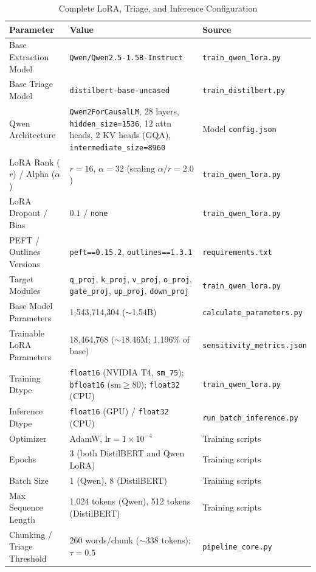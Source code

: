 \documentclass[11pt,a4paper]{article}
\begin{document}
\begin{table}[htbp]
\centering
\caption{Complete LoRA, Triage, and Inference Configuration}
\label{tab:lora_config}
\small
\begin{tabular}{@{}p{3.4cm} p{6.2cm} p{3.2cm}@{}}
\toprule
\textbf{Parameter} & \textbf{Value} & \textbf{Source} \\
\midrule
Base Extraction Model & \texttt{Qwen/Qwen2.5-1.5B-Instruct} & \texttt{train\_qwen\_lora.py} \\
Base Triage Model & \texttt{distilbert-base-uncased} & \texttt{train\_distilbert.py} \\
Qwen Architecture & \texttt{Qwen2ForCausalLM}, 28 layers, \texttt{hidden\_size=1536}, 12 attn heads, 2 KV heads (GQA), \texttt{intermediate\_size=8960} & Model \texttt{config.json} \\
LoRA Rank ($r$) / Alpha ($\alpha$) & $r=16$, $\alpha=32$ (scaling $\alpha/r = 2.0$) & \texttt{train\_qwen\_lora.py} \\
LoRA Dropout / Bias & $0.1$ / \texttt{none} & \texttt{train\_qwen\_lora.py} \\
PEFT / Outlines Versions & \texttt{peft==0.15.2}, \texttt{outlines==1.3.1} & \texttt{requirements.txt} \\
Target Modules & \texttt{q\_proj}, \texttt{k\_proj}, \texttt{v\_proj}, \texttt{o\_proj}, \texttt{gate\_proj}, \texttt{up\_proj}, \texttt{down\_proj} & \texttt{train\_qwen\_lora.py} \\
Base Model Parameters & 1,543,714,304 ($\sim$1.54B) & \texttt{calculate\_parameters.py} \\
Trainable LoRA Parameters & 18,464,768 ($\sim$18.46M; 1.196\% of base) & \texttt{sensitivity\_metrics.json} \\
Training Dtype & \texttt{float16} (NVIDIA T4, \texttt{sm\_75}); \texttt{bfloat16} ($\text{sm}\ge 80$); \texttt{float32} (CPU) & \texttt{train\_qwen\_lora.py} \\
Inference Dtype & \texttt{float16} (GPU) / \texttt{float32} (CPU) & \texttt{run\_batch\_inference.py} \\
Optimizer & AdamW, $\text{lr}=1\times 10^{-4}$ & Training scripts \\
Epochs & 3 (both DistilBERT and Qwen LoRA) & Training scripts \\
Batch Size & 1 (Qwen), 8 (DistilBERT) & Training scripts \\
Max Sequence Length & 1,024 tokens (Qwen), 512 tokens (DistilBERT) & Training scripts \\
Chunking / Triage Threshold & 260 words/chunk ($\sim$338 tokens); $\tau = 0.5$ & \texttt{pipeline\_core.py} \\

\end{tabular}
\end{table}
\end{document}
